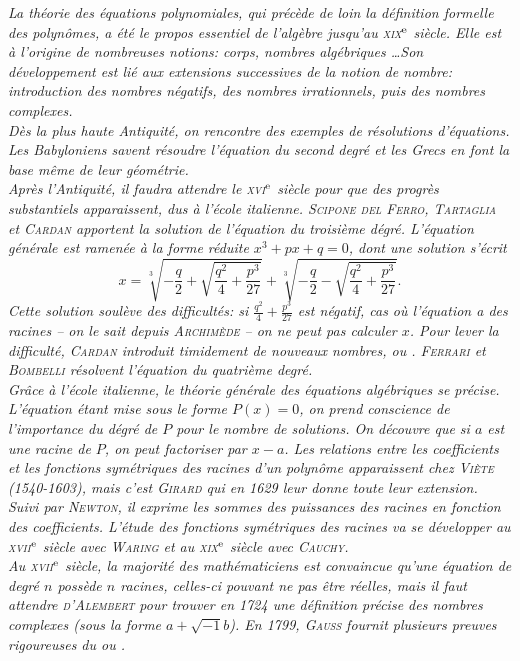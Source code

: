 \textsl{
La théorie des équations polynomiales, qui précède de loin la définition formelle des polynômes, a été le propos essentiel de l'algèbre jusqu'au \textsc{xix}$^{\mathrm{e}}$ siècle. Elle est à l'origine de nombreuses notions: corps, nombres algébriques \dots Son développement est lié aux extensions successives de la notion de nombre: introduction des nombres négatifs, des nombres irrationnels, puis des nombres complexes. \\ 
Dès la plus haute Antiquité, on rencontre des exemples de résolutions d'équations. Les Babyloniens savent résoudre l'équation du second degré et les Grecs en font la base même de leur géométrie. \\
Après l'Antiquité, il faudra attendre le \textsc{xvi}$^{\mathrm{e}}$ siècle pour que des progrès substantiels apparaissent, dus à l'école italienne. \textsc{Scipone del Ferro}, \textsc{Tartaglia} et \textsc{Cardan} apportent la solution de l'équation du troisième dégré. L'équation générale est ramenée à la forme réduite $x^3 + px + q = 0$, dont une solution s'écrit
$$x = \sqrt[3]{-\frac{q}{2} + \sqrt{\frac{q^2}{4} + \frac{p^3}{27}}} + \sqrt[3]{-\frac{q}{2} - \sqrt{\frac{q^2}{4} + \frac{p^3}{27}}}.$$
Cette solution soulève des difficultés: si $\frac{q^2}{4} + \frac{p^3}{27}$ est négatif, cas où l'équation a des racines -- on le sait depuis \textsc{Archimède} -- on ne peut pas calculer $x$. Pour lever la difficulté, \textsc{Cardan} introduit timidement de nouveaux nombres,  ou . \textsc{Ferrari} et \textsc{Bombelli} résolvent l'équation du quatrième degré. \\
Grâce à l'école italienne, le théorie générale des équations algébriques se précise. L'équation étant mise sous le forme $P(x) = 0$, on prend conscience de l'importance du dégré de $P$ pour le nombre de solutions. On découvre que si $a$ est une racine de $P$, on peut factoriser par $x-a$. Les relations entre les coefficients et les fonctions symétriques des racines d'un polynôme apparaissent chez \textsc{Viète} (1540-1603), mais c'est \textsc{Girard} qui en 1629 leur donne toute leur extension. Suivi par \textsc{Newton}, il exprime les sommes des puissances des racines en fonction des coefficients. L'étude des fonctions symétriques des racines va se développer au \textsc{xvii}$^{\mathrm{e}}$ siècle avec \textsc{Waring} et au \textsc{xix}$^{\mathrm{e}}$ siècle avec \textsc{Cauchy}. \\
Au \textsc{xvii}$^{\mathrm{e}}$ siècle, la majorité des mathématiciens est convaincue qu'une équation de degré $n$ possède $n$ racines, celles-ci pouvant ne pas être réelles, mais il faut attendre \textsc{d'Alembert} pour trouver en 1724 une définition précise des nombres complexes (sous la forme $a + \sqrt{-1} b$). En 1799, \textsc{Gauss} fournit plusieurs preuves rigoureuses du  ou . \\
}
